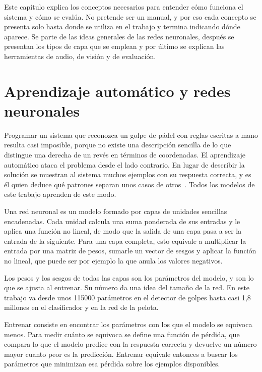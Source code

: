 
Este capítulo explica los conceptos necesarios para entender cómo funciona el sistema y cómo se evalúa.
No pretende ser un manual, y por eso cada concepto se presenta solo hasta donde se utiliza en el trabajo y termina indicando dónde aparece.
Se parte de las ideas generales de las redes neuronales, después se presentan los tipos de capa que se emplean y por último se explican las herramientas de audio, de visión y de evaluación.

\section{Aprendizaje automático y redes neuronales}
\label{sec:fund-aprendizaje}

Programar un sistema que reconozca un golpe de pádel con reglas escritas a mano resulta casi imposible, porque no existe una descripción sencilla de lo que distingue una derecha de un revés en términos de coordenadas.
El aprendizaje automático ataca el problema desde el lado contrario.
En lugar de describir la solución se muestran al sistema muchos ejemplos con su respuesta correcta, y es él quien deduce qué patrones separan unos casos de otros~\cite{goodfellow2016deep}.
Todos los modelos de este trabajo aprenden de este modo.

Una red neuronal es un modelo formado por capas de unidades sencillas encadenadas.
Cada unidad calcula una suma ponderada de sus entradas y le aplica una función no lineal, de modo que la salida de una capa pasa a ser la entrada de la siguiente.
Para una capa completa, esto equivale a multiplicar la entrada por una matriz de pesos, sumarle un vector de sesgos y aplicar la función no lineal, que puede ser por ejemplo la que anula los valores negativos.

Los pesos y los sesgos de todas las capas son los parámetros del modelo, y son lo que se ajusta al entrenar.
Su número da una idea del tamaño de la red.
En este trabajo va desde unos \num{115000} parámetros en el detector de golpes hasta casi 1,8 millones en el clasificador y en la red de la pelota.

Entrenar consiste en encontrar los parámetros con los que el modelo se equivoca menos.
Para medir cuánto se equivoca se define una función de pérdida, que compara lo que el modelo predice con la respuesta correcta y devuelve un número mayor cuanto peor es la predicción.
Entrenar equivale entonces a buscar los parámetros que minimizan esa pérdida sobre los ejemplos disponibles.

